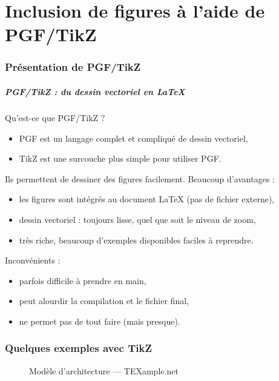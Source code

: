
\part{Inclusion de figures à l'aide de PGF/TikZ}

\section{Présentation de PGF/TikZ}

\begin{frame}
  \frametitle{PGF/TikZ : du dessin vectoriel en \LaTeX}

Qu'est-ce que PGF/TikZ ?
\begin{itemize}
  \item PGF est un langage complet et compliqué de dessin vectoriel,
  \item TikZ est une surcouche plus simple pour utiliser PGF.
\end{itemize}

\bigskip
Ils permettent de dessiner des figures facilement. Beaucoup d'avantages :
\begin{itemize}
  \item les figures sont intégrés au document \LaTeX{} (pas de fichier externe),
  \item dessin vectoriel : toujours lisse, quel que soit le niveau de zoom,
  \item très riche, beaucoup d'exemples disponibles faciles à reprendre.
\end{itemize}

\bigskip
Inconvénients :
\begin{itemize}
  \item parfois difficile à prendre en main,
  \item peut alourdir la compilation et le fichier final,
  \item ne permet pas de tout faire (mais presque).
\end{itemize}
\end{frame}



\section{Quelques exemples avec TikZ}



\begin{frame}
  \begin{figure}
    \centering
    \tikzexa
    \caption{\footnotesize Modèle d'architecture --- TEXample.net \cite{tikzandpgfexamples}}
  \end{figure}
\end{frame}

